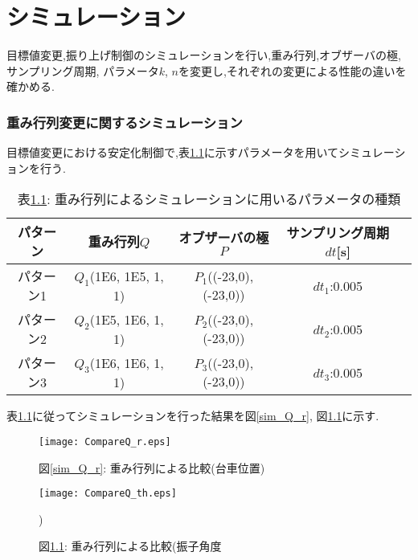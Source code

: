 \chapter{シミュレーション}
目標値変更,振り上げ制御のシミュレーションを行い,重み行列,オブザーバの極,サンプリング周期,
パラメータ$k$, $n$を変更し,それぞれの変更による性能の違いを確かめる.

\subsection{重み行列変更に関するシミュレーション}
目標値変更における安定化制御で,表\ref{sim_Q}に示すパラメータを用いてシミュレーションを行う.

\begin{table}[htbp]
    \begin{center}
        \caption{表\ref{sim_Q}: 重み行列によるシミュレーションに用いるパラメータの種類}
        \begin{tabular}{|c|c|c|c|c|} \hline
            パターン & 重み行列$Q$ & オブザーバの極$P$ & サンプリング周期$dt$[s] \\ \hline \hline
            パターン1 & $Q_1$(1E6, 1E5, 1, 1) & $P_1$((-23,0), (-23,0)) & $dt_1$:0.005 \\ \hline
            パターン2 & $Q_2$(1E5, 1E6, 1, 1) & $P_2$((-23,0), (-23,0)) & $dt_2$:0.005 \\ \hline
            パターン3 & $Q_3$(1E6, 1E6, 1, 1) & $P_3$((-23,0), (-23,0)) & $dt_3$:0.005 \\ \hline
        \end{tabular}
        \label{sim_Q}
    \end{center}
\end{table}

表\ref{sim_Q}に従ってシミュレーションを行った結果を図\ref{sim_Q_r}, 図\ref{sim_Q_th}に示す.

\begin{figure}[htbp]
    \begin{minipage}{0.5\hsize}
        \begin{center}
            \texttt{[image: CompareQ\_r.eps]}
            \caption{図\ref{sim_Q_r}: 重み行列による比較(台車位置)}
            \label{sim_Q_r}
        \end{center}
    \end{minipage}
    \begin{minipage}{0.5\hsize}
        \begin{center}
            \texttt{[image: CompareQ\_th.eps]}
            \caption{図\ref{sim_Q_th}: 重み行列による比較(振子角度})
            \label{sim_Q_th}
        \end{center}
    \end{minipage}
\end{figure}

